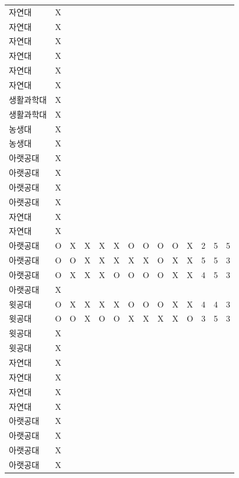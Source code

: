 \documentclass[11pt,a4paper]{article}
\begin{document}
\begin{center}
\begin{tabular}{ | p{2cm} | c | c | c | c | c | c | c | c | c | c | c | c | c | }
자연대 & X & & & & & & & & & & & & \\
자연대 & X & & & & & & & & & & & & \\
자연대 & X & & & & & & & & & & & & \\
자연대 & X & & & & & & & & & & & & \\
자연대 & X & & & & & & & & & & & & \\
자연대 & X & & & & & & & & & & & & \\
생활과학대 & X & & & & & & & & & & & & \\
생활과학대 & X & & & & & & & & & & & & \\
농생대 & X & & & & & & & & & & & & \\
농생대 & X & & & & & & & & & & & & \\
아랫공대 & X & & & & & & & & & & & & \\
아랫공대 & X & & & & & & & & & & & & \\
아랫공대 & X & & & & & & & & & & & & \\
아랫공대 & X & & & & & & & & & & & & \\
자연대 & X & & & & & & & & & & & & \\
자연대 & X & & & & & & & & & & & & \\
아랫공대 & O & X & X & X & X & O & O & O & O & X & 2 & 5 & 5 \\
아랫공대 & O & O & X & X & X & X & X & O & X & X & 5 & 5 & 3 \\
아랫공대 & O & X & X & X & O & O & O & O & X & X & 4 & 5 & 3 \\
아랫공대 & X & & & & & & & & & & & & \\
윗공대 & O & X & X & X & X & O & O & O & X & X & 4 & 4 & 3 \\
윗공대 & O & O & X & O & O & X & X & X & X & O & 3 & 5 & 3 \\
윗공대 & X & & & & & & & & & & & & \\
윗공대 & X & & & & & & & & & & & & \\
자연대 & X & & & & & & & & & & & & \\
자연대 & X & & & & & & & & & & & & \\
자연대 & X & & & & & & & & & & & & \\
자연대 & X & & & & & & & & & & & & \\
아랫공대 & X & & & & & & & & & & & & \\
아랫공대 & X & & & & & & & & & & & & \\
아랫공대 & X & & & & & & & & & & & & \\
아랫공대 & X & & & & & & & & & & & & \\

\end{tabular}
\end{center}
\end{document}
